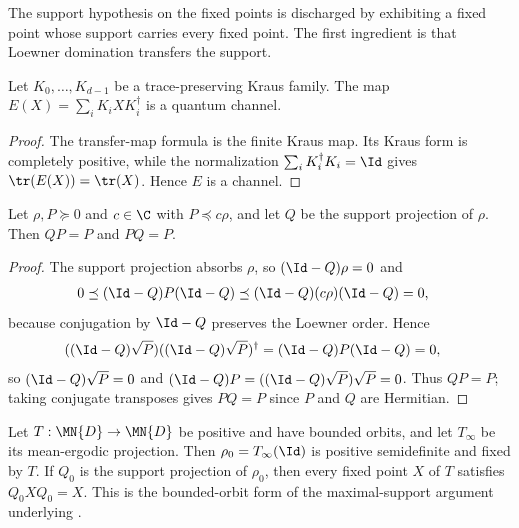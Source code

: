The support hypothesis on the fixed points is discharged by exhibiting a
fixed point whose support carries every fixed point. The first ingredient is
that Loewner domination transfers the support.

\begin{lemma}%
    \label{lem:isChannel_transferMap}
    \leanok
    Let $K_0,\ldots,K_{d-1}$ be a trace-preserving Kraus family. The map
    $E(X)=\sum_iK_iXK_i^\dagger$ is a quantum channel.
\end{lemma}

\begin{proof}\leanok
    The transfer-map formula is the finite Kraus map. Its Kraus form is
    completely positive, while the normalization
    $\sum_iK_i^\dagger K_i=\Id$ gives $\tr(E(X))=\tr(X)$. Hence $E$ is a
    channel.
\end{proof}

\begin{lemma}%
    \label{lem:stationaryProj_absorb_of_le}
    \leanok
    Let $\rho,P\succeq0$ and $c\in\C$ with $P\preceq c\rho$, and let $Q$
    be the support projection of $\rho$. Then $QP=P$ and $PQ=P$.
\end{lemma}

\begin{proof}
    \leanok
    The support projection absorbs $\rho$, so $(\Id-Q)\rho=0$ and
    \begin{align}
        0
         & \preceq(\Id-Q)P(\Id-Q)
        \preceq(\Id-Q)(c\rho)(\Id-Q)
        =0,
        \notag
    \end{align}
    because conjugation by $\Id-Q$ preserves the Loewner order. Hence
    \begin{align}
        ((\Id-Q)\sqrt{P})
        ((\Id-Q)\sqrt{P})^\dagger
         & =(\Id-Q)P(\Id-Q)=0,
        \notag
    \end{align}
    so $(\Id-Q)\sqrt{P}=0$ and
    $(\Id-Q)P=((\Id-Q)\sqrt{P})\sqrt{P}=0$. Thus $QP=P$; taking conjugate
    transposes gives $PQ=P$ since $P$ and $Q$ are Hermitian.
\end{proof}

\begin{theorem}%
    \label{thm:maximalSupport_fixedPoint_of_bounded_orbits}
    \leanok
    Let $T:\MN{D}\to\MN{D}$ be positive and have bounded orbits, and let
    $T_\infty$ be its mean-ergodic projection. Then
    $\rho_0=T_\infty(\Id)$ is positive semidefinite and fixed by $T$. If
    $Q_0$ is the support projection of $\rho_0$, then every fixed point $X$
    of $T$ satisfies $Q_0XQ_0=X$. This is the bounded-orbit form of the
    maximal-support argument underlying
    \cite[Proposition~6.9]{Wolf2012Quantum}.
\end{theorem}


